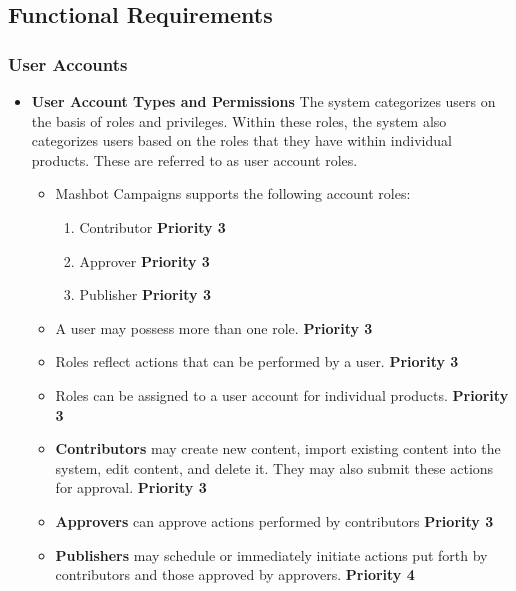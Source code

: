 \documentclass{report}
\begin{document}
\subsection{Functional Requirements}
\subsubsection{User Accounts} %
\begin{itemize}
\item \textbf{User Account Types and Permissions} The system
  categorizes users on the basis of roles and privileges. Within these
  roles, the system also categorizes users based on the roles that
  they have within individual products. These are referred to as user
  account roles.
  \begin{itemize}
  \item Mashbot Campaigns supports the following account roles:
    \begin{enumerate}
    \item Contributor \textbf{Priority 3}
    \item Approver \textbf{Priority 3}
    \item
      Publisher \textbf{Priority 3}
    \end{enumerate}
  \item A user may possess more than one role. \textbf{Priority 3}
  \item Roles reflect actions that can be performed by a
    user. \textbf{Priority 3}
  \item Roles can be assigned to a user account for individual
    products. \textbf{Priority 3}
  \item \textbf{Contributors} may create new content, import
    existing content into the system, edit content, and delete
    it. They may also submit these actions for approval. \textbf{Priority 3}
  \item \textbf{Approvers} can approve actions performed by contributors \textbf{Priority 3}
  \item \textbf{Publishers} may schedule or immediately initiate
    actions put forth by contributors and those approved by approvers.  \textbf{Priority 4}
    
  \end{itemize}
  

\end{itemize}
\end{document}
